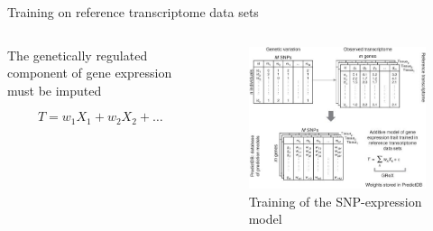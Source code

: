 \documentclass[aspectratio=169,12pt]{beamer}
\begin{document}
\begin{frame}{Training on reference transcriptome data sets}
	
	\begin{columns}
		\begin{column}{0.4\textwidth}
			The genetically regulated component of gene expression must 
be imputed

			\begin{equation*}
				T = w_1 X_1 + w_2 X_2 + \ldots
			\end{equation*}
		\end{column}

		\begin{column}{0.6\textwidth}
			\begin{figure}
				\includegraphics[width=\textwidth]{gamazon2015/2-grex_estimation_part1}
				\caption{Training of the SNP-expression model}
			\end{figure}
		\end{column}
	\end{columns}


\end{frame}
\end{document}
